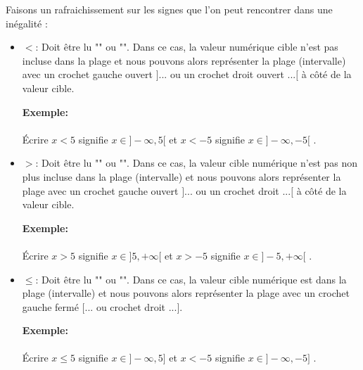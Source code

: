 	Faisons un rafraichissement sur les signes que l'on peut rencontrer dans une inégalité :
	\begin{itemize}
		\item $<$: Doit être lu "" ou "". Dans ce cas, la valeur numérique cible n'est pas incluse dans la plage et nous pouvons alors représenter la plage (intervalle) avec un crochet gauche ouvert $] ...$ ou un crochet droit ouvert $... [$ à côté de la valeur cible.
		
		\begin{tcolorbox}[colframe=black,colback=white,sharp corners]
		\textbf{{\Large {}}Exemple:}\\\\
		Écrire $x<5$ signifie $x \in ]-\infty,5[$ et $x<-5$ signifie $x \in ]-\infty,-5[$ .
		\end{tcolorbox}
		
		\item $>$: Doit être lu "" ou "". Dans ce cas, la valeur cible numérique n'est pas non plus incluse dans la plage (intervalle) et nous pouvons alors représenter la plage avec un crochet gauche ouvert $] ...$ ou un crochet droit $... [$ à côté de la valeur cible.
		
		\begin{tcolorbox}[colframe=black,colback=white,sharp corners]
	\textbf{{\Large {}}Exemple:}\\\\
		Écrire $x>5$ signifie $x \in ]5,+\infty[$ et $x>-5$ signifie $x \in ]-5,+\infty[$ .
		\end{tcolorbox}
		
		\item $\leq$: Doit être lu "" ou "". Dans ce cas, la valeur cible numérique est dans la plage (intervalle) et nous pouvons alors représenter la plage avec un crochet gauche fermé $[...$ ou crochet droit $...]$.
		
		\begin{tcolorbox}[colframe=black,colback=white,sharp corners]
	\textbf{{\Large {}}Exemple:}\\\\
		Écrire $x\leq 5$ signifie $x \in ]-\infty,5]$ et $x<-5$ signifie $x \in ]-\infty,-5]$ .
		\end{tcolorbox}
		

\end{itemize}
